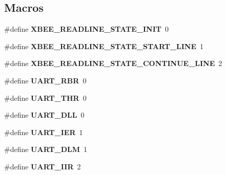 \subsection*{Macros}
\begin{DoxyCompactItemize}
\item 
\mbox{\label{group__hal__dos_ga029adc5ad3f556e4c5671b21529c0dd1}} 
\#define {\bfseries X\+B\+E\+E\+\_\+\+R\+E\+A\+D\+L\+I\+N\+E\+\_\+\+S\+T\+A\+T\+E\+\_\+\+I\+N\+IT}~0
\item 
\mbox{\label{group__hal__dos_gaa3a6d3307bf92060ea7c2664dc9e7b6b}} 
\#define {\bfseries X\+B\+E\+E\+\_\+\+R\+E\+A\+D\+L\+I\+N\+E\+\_\+\+S\+T\+A\+T\+E\+\_\+\+S\+T\+A\+R\+T\+\_\+\+L\+I\+NE}~1
\item 
\mbox{\label{group__hal__dos_ga5eb45373870b820af1c6c5d2918ee9c1}} 
\#define {\bfseries X\+B\+E\+E\+\_\+\+R\+E\+A\+D\+L\+I\+N\+E\+\_\+\+S\+T\+A\+T\+E\+\_\+\+C\+O\+N\+T\+I\+N\+U\+E\+\_\+\+L\+I\+NE}~2
\item 
\mbox{\label{group__hal__dos_ga3eb7d5a767dae7774aa2b4be28e20a7e}} 
\#define {\bfseries U\+A\+R\+T\+\_\+\+R\+BR}~0
\item 
\mbox{\label{group__hal__dos_ga7a676f075475e46d27eb878977b867ec}} 
\#define {\bfseries U\+A\+R\+T\+\_\+\+T\+HR}~0
\item 
\mbox{\label{group__hal__dos_ga7ff21e0cfc73a2db80c3907c5cac5a61}} 
\#define {\bfseries U\+A\+R\+T\+\_\+\+D\+LL}~0
\item 
\mbox{\label{group__hal__dos_gaaf7aaa372e86b3aa99e6c78242be2722}} 
\#define {\bfseries U\+A\+R\+T\+\_\+\+I\+ER}~1
\item 
\mbox{\label{group__hal__dos_ga63f95172026aa533407e357e73b04551}} 
\#define {\bfseries U\+A\+R\+T\+\_\+\+D\+LM}~1
\item 
\mbox{\label{group__hal__dos_ga16add7e6b9f91a6698c5910704111b68}} 
\#define {\bfseries U\+A\+R\+T\+\_\+\+I\+IR}~2
\item 
\mbox{\label{group__hal__dos_ga220a678f91ca8244b30fe813200c26c1}} 

\end{DoxyCompactItemize}
